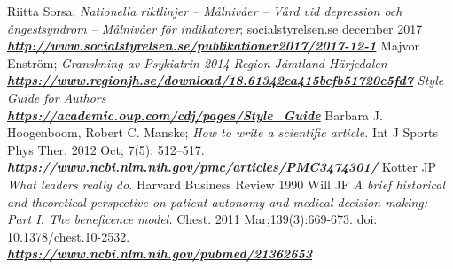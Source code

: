 \documentclass[12pt,a4paper,oneside]{article}
\renewcommand{\_}{\hspace{0.1cm}}
\begin{document}
\begin{thebibliography}{11}
Riitta Sorsa; \emph{Nationella riktlinjer -- Målnivåer -- Vård vid depression och ångestsyndrom -- Målnivåer för indikatorer}; socialstyrelsen.se december 2017\\\textbf{\emph{\href{http://www.socialstyrelsen.se/publikationer2017/2017-12-1}{\url{http://www.socialstyrelsen.se/publikationer2017/2017-12-1}}}}
Majvor Enström; \emph{Granskning av Psykiatrin 2014 Region Jämtland-Härjedalen}\\\textbf{\emph{\href{https://www.regionjh.se/download/18.61342ea415bcfb51720c5fd7}{\url{https://www.regionjh.se/download/18.61342ea415bcfb51720c5fd7}}}}
\emph{Style Guide for Authors} \\\textbf{\emph{\href{https://academic.oup.com/cdj/pages/Style_Guide}{\url{https://academic.oup.com/cdj/pages/Style_Guide}}}}
Barbara J. Hoogenboom, Robert C. Manske; \emph{How to write a scientific article.} Int J Sports Phys Ther. 2012 Oct; 7(5): 512--517. \\\textbf{\emph{\href{https://www.ncbi.nlm.nih.gov/pmc/articles/PMC3474301/}{\url{https://www.ncbi.nlm.nih.gov/pmc/articles/PMC3474301/}}}}
Kotter JP \emph{What leaders really do.} Harvard Business Review 1990
Will JF \emph{A brief historical and theoretical perspective on patient autonomy and medical decision making: Part I: The beneficence model.} Chest. 2011 Mar;139(3):669-673. doi: 10.1378/chest.10-2532. \\\textbf{\emph{\href{https://www.ncbi.nlm.nih.gov/pubmed/21362653}{\url{https://www.ncbi.nlm.nih.gov/pubmed/21362653}}}}


\end{thebibliography}
\end{document}
